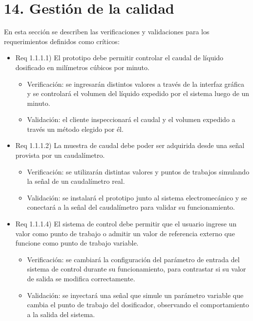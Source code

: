 \documentclass[
11pt, %
]{charter}
\begin{document}
\section{14. Gestión de la calidad}
\label{sec:calidad}

En esta sección se describen las verificaciones y validaciones para los requerimientos definidos como críticos:

\begin{itemize} 
\item Req 1.1.1.1) El prototipo debe permitir controlar el caudal de líquido dosificado en milímetros cúbicos por minuto.

\begin{itemize}
	\item Verificación: se ingresarán distintos valores a través de la interfaz gráfica y se controlará el volumen del líquido expedido por el sistema luego de un minuto.
	\item Validación: el cliente inspeccionará el caudal y el volumen expedido a través un método elegido por él.
\end{itemize}

\item Req 1.1.1.2) La muestra de caudal debe poder ser adquirida desde una señal provista por un caudalímetro.

\begin{itemize}
	\item Verificación: se utilizarán distintas valores y puntos de trabajos simulando la señal de un caudalímetro real.
	\item Validación: se instalará el prototipo junto al sistema electromecánico y se conectará a la señal del caudalímetro para validar su funcionamiento.
\end{itemize}

\item Req 1.1.1.4) El sistema de control debe permitir que el usuario ingrese un valor como punto de trabajo o admitir un valor de referencia externo que funcione como punto de trabajo variable.

\begin{itemize}
	\item Verificación: se cambiará la configuración del parámetro de entrada del sistema de control durante su funcionamiento, para contrastar si su valor de salida se modifica correctamente.
	\item Validación: se inyectará una señal que simule un parámetro variable que cambia el punto de trabajo del dosificador, observando el comportamiento a la salida del sistema.
\end{itemize}


\end{itemize}
\end{document}
